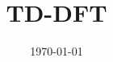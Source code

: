 \documentclass[12pt,a4paper]{article}
\begin{document}
\title{TD-DFT}
\date{\today}
\maketitle

%
\clearpage


\end{document}
